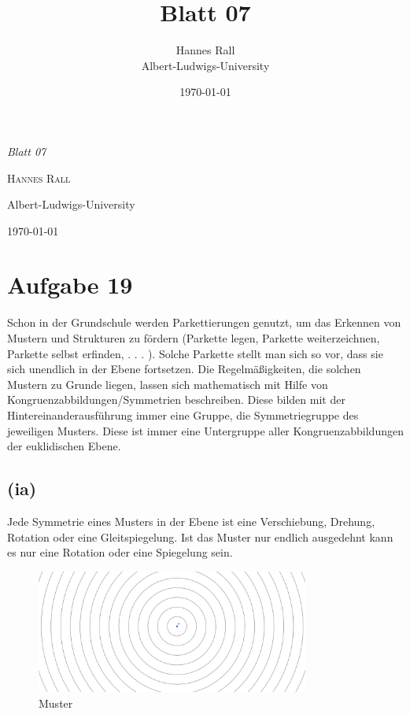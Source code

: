 \documentclass[12pt,a4paper]{article}
\title{Blatt 07}
\author{Hannes Rall \\ Albert-Ludwigs-University}
\date{\today}
\begin{document}
\begin{titlepage}
    \centering
    \vspace*{2cm}
    {\Huge\itshape Blatt 07\par}
    \vspace{2cm}
    {\Large\textsc{Hannes Rall}\par}
    \vfill
    {\large Albert-Ludwigs-University\\}
    \vspace{1cm}
    {\large\today\par}
\end{titlepage}
\newpage
\section*{Aufgabe 19}
Schon in der Grundschule werden Parkettierungen genutzt, um das Erkennen
von Mustern und Strukturen zu fördern (Parkette legen, Parkette weiterzeichnen, Parkette selbst erfinden, . . . ).
Solche Parkette stellt man sich so vor, dass sie sich unendlich in der Ebene fortsetzen. Die Regelmäßigkeiten, die
solchen Mustern zu Grunde liegen, lassen sich mathematisch mit Hilfe von Kongruenzabbildungen/Symmetrien
beschreiben. Diese bilden mit der Hintereinanderausführung immer eine Gruppe, die Symmetriegruppe des
jeweiligen Musters. Diese ist immer eine Untergruppe aller Kongruenzabbildungen der euklidischen Ebene.
\subsection*{(ia)}
Jede Symmetrie eines Musters in der Ebene ist eine Verschiebung, Drehung, Rotation oder eine Gleitspiegelung. Ist das Muster nur endlich ausgedehnt kann es nur eine Rotation oder eine Spiegelung sein.\\

\begin{figure}[htbp]
    \centering
    \includegraphics[width=0.8\textwidth]{Blatt07_Aufgabe_19_ia.png}
    \caption{Muster}
    \label{fig:Aufgabe_19}
\end{figure}
\end{document}

